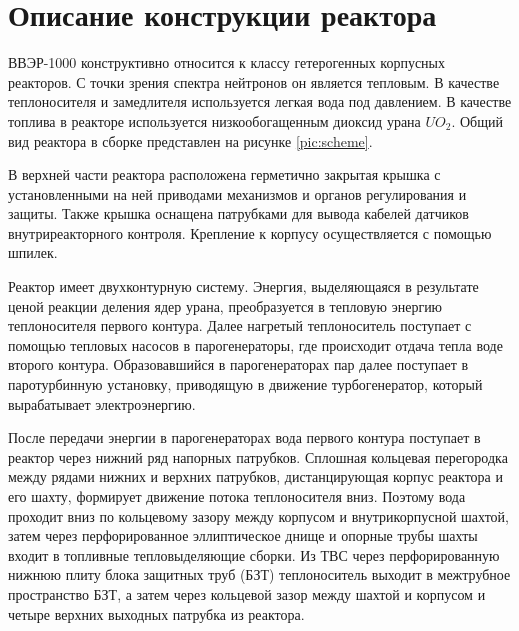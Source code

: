

\section{Описание конструкции реактора}
ВВЭР-1000 конструктивно относится к классу гетерогенных корпусных реакторов. С точки зрения спектра нейтронов он является тепловым. В качестве теплоносителя и замедлителя используется легкая вода под давлением. В качестве топлива в реакторе используется низкообогащенным диоксид урана $UO_2$. Общий вид реактора в сборке представлен на рисунке \ref{pic:scheme}. 


В верхней части реактора расположена герметично закрытая крышка с установленными на ней приводами механизмов и органов регулирования и защиты. Также крышка оснащена патрубками для вывода кабелей датчиков внутриреакторного контроля. Крепление  к корпусу осуществляется с помощью шпилек. 


Реактор имеет двухконтурную систему. Энергия, выделяющаяся в результате ценой реакции деления ядер урана, преобразуется в тепловую энергию теплоносителя первого контура. Далее нагретый теплоноситель поступает с помощью тепловых насосов в парогенераторы, где происходит отдача тепла воде второго контура. Образовавшийся в парогенераторах пар далее поступает в паротурбинную установку, приводящую в движение турбогенератор, который вырабатывает электроэнергию.

После передачи энергии в парогенераторах вода первого контура поступает в реактор через нижний ряд напорных патрубков. Сплошная кольцевая перегородка между рядами нижних и верхних патрубков, дистанцирующая корпус реактора и его шахту, формирует движение потока теплоносителя вниз. Поэтому вода проходит вниз по кольцевому зазору между корпусом и внутрикорпусной шахтой, затем через перфорированное эллиптическое днище и опорные трубы шахты входит в топливные тепловыделяющие сборки. Из ТВС через перфорированную нижнюю плиту блока защитных труб (БЗТ) теплоноситель выходит в межтрубное пространство БЗТ, а затем через кольцевой зазор между шахтой и корпусом и четыре верхних выходных патрубка из реактора.

